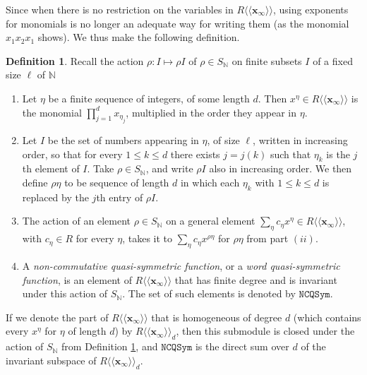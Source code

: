 \documentclass{article}
\theoremstyle{definition}
\newtheorem{defn}[thm]{Definition}
\begin{document}
Since when there is no restriction on the variables in $R\langle\langle\mathbf{x}_{\infty}\rangle\rangle$, using exponents for monomials is no longer an adequate way for writing them (as the monomial $x_{1}x_{2}x_{1}$ shows). We thus make the following definition.
\begin{defn}
Recall the action $\rho:I \mapsto \rho I$ of $\rho \in S_{\mathbb{N}}$ on finite subsets $I$ of a fixed size $\ell$ of $\mathbb{N}$
\begin{enumerate}[$(i)$]
\item Let $\eta$ be a finite sequence of integers, of some length $d$. Then $x^{\eta} \in R\langle\langle\mathbf{x}_{\infty}\rangle\rangle$ is the monomial $\prod_{j=1}^{d}x_{\eta_{j}}$, multiplied in the order they appear in $\eta$.
\item Let $I$ be the set of numbers appearing in $\eta$, of size $\ell$, written in increasing order, so that for every $1 \leq k \leq d$ there exists $j=j(k)$ such that $\eta_{k}$ is the $j$th element of $I$. Take $\rho \in S_{\mathbb{N}}$, and write $\rho I$ also in increasing order. We then define $\rho\eta$ to be sequence of length $d$ in which each $\eta_{k}$ with $1 \leq k \leq d$ is replaced by the $j$th entry of $\rho I$.
\item The action of an element $\rho \in S_{\mathbb{N}}$ on a general element $\sum_{\eta}c_{\eta}x^{\eta} \in R\langle\langle\mathbf{x}_{\infty}\rangle\rangle$, with $c_{\eta} \in R$ for every $\eta$, takes it to $\sum_{\eta}c_{\eta}x^{\rho\eta}$ for $\rho\eta$ from part $(ii)$.
\item A \emph{non-commutative quasi-symmetric function}, or a \emph{word quasi-symmetric function}, is an element of $R\langle\langle\mathbf{x}_{\infty}\rangle\rangle$ that has finite degree and is invariant under this action of $S_{\mathbb{N}}$. The set of such elements is denoted by $\mathtt{NCQSym}$.
\end{enumerate} \label{NCQSymdef}
\end{defn}
If we denote the part of $R\langle\langle\mathbf{x}_{\infty}\rangle\rangle$ that is homogeneous of degree $d$ (which contains every $x^{\eta}$ for $\eta$ of length $d$) by $R\langle\langle\mathbf{x}_{\infty}\rangle\rangle_{d}$, then this submodule is closed under the action of $S_{\mathbb{N}}$ from Definition \ref{NCQSymdef}, and $\mathtt{NCQSym}$ is the direct sum over $d$ of the invariant subspace of $R\langle\langle\mathbf{x}_{\infty}\rangle\rangle_{d}$.

\medskip
\end{document}
